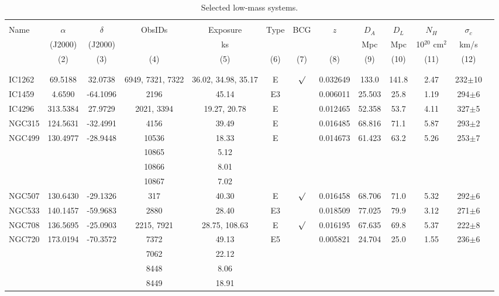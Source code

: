 \documentclass[apjl]{emulateapj}
\begin{document}
\begin{table}
\fontsize{8}{8}
\selectfont
\caption{Selected low-mass systems.}\label{tab1}
\centering
\begin{tabular}{lcccccccccccc}
\hline
 && \\
Name      & $\alpha$ & $\delta$ & ObsIDs & Exposure & Type & BCG  &  $z$     &  $D_A$ &  $D_L$  &  $N_{H}$ & $\sigma_c$ \\
          &  (J2000)   & (J2000)    &       &    ks     &      &         &          &   Mpc  &  Mpc    &  10$^{20}$ cm$^{2}$ & km/s \\
          & (2) & (3) & (4) & (5) & (6) & (7) &(8) & (9) & (10) & (11) & (12) \\
&& \\
\hline
&&\\
IC1262  & 69.5188 & 32.0738 & 6949, 7321, 7322 & 36.02, 34.98, 35.17 & E & $\surd$ & 0.032649 & 133.0 & 141.8 & 2.47 & 232$\pm$10 \\
IC1459  & 4.6590 & -64.1096   & 2196 & 45.14 & E3 & & 0.006011 & 25.503 & 25.8 & 1.19 & 294$\pm$6 \\
IC4296  & 313.5384 & 27.9729 & 2021, 3394 & 19.27, 20.78 & E &  & 0.012465 & 52.358 & 53.7 & 4.11 & 327$\pm$5 \\
NGC315  & 124.5631 & -32.4991 & 4156 & 39.49 & E &         & 0.016485 & 68.816 & 71.1 & 5.87 & 293$\pm$2 \\
NGC499  & 130.4977 & -28.9448 & 10536 & 18.33 & E & & 0.014673 & 61.423 & 63.2 & 5.26 & 253$\pm$7 \\
        & && 10865 & 5.12 & \\
        & && 10866 & 8.01 & \\
        & && 10867 & 7.02 & \\
NGC507  & 130.6430 & -29.1326 & 317 & 40.30 & E & $\surd$ & 0.016458 & 68.706 & 71.0 & 5.32 & 292$\pm$6 \\
NGC533  & 140.1457 & -59.9683 & 2880 & 28.40 & E3 & & 0.018509 & 77.025 & 79.9 & 3.12 & 271$\pm$6 \\
NGC708  & 136.5695 & -25.0903 &  2215, 7921 & 28.75, 108.63   & E    & $\surd$ & 0.016195 & 67.635 & 69.8  &  5.37 & 222$\pm$8\\
NGC720  & 173.0194 & -70.3572 & 7372 & 49.13 & E5 &    & 0.005821 & 24.704 & 25.0 & 1.55 & 236$\pm$6\\
        & && 7062 & 22.12 & \\
        & && 8448 & 8.06 & \\
        & && 8449 & 18.91 & \\

\end{tabular}
\end{table}
\end{document}

